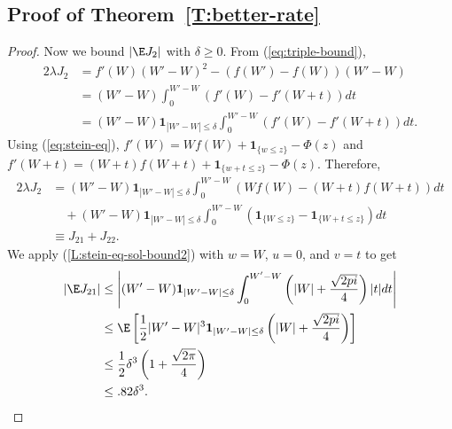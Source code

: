 \subsection{Proof of Theorem~\ref{T:better-rate}}
\begin{proof}
  Now we bound $|\E J_2|$ with $\delta \geq 0$.  From (\ref{eq:triple-bound}),
  \begin{align*}
    2 \lambda J_2 &= f'(W)(W'-W)^2-(f(W')-f(W))(W'-W) \\
    &= (W'-W) \int_0^{W'-W}(f'(W) - f'(W+t)) dt \\
    &= (W'-W) \mathbf{1}_{|W'-W| \leq \delta} \int_0^{W'-W}(f'(W)-f'(W+t)) dt.
  \end{align*}
  Using (\ref{eq:stein-eq}), $f'(W) = Wf(W) + \mathbf{1}_{\{w \leq z\}} - \Phi(z)$ and
  $f'(W + t) = (W + t)f(W + t) + \mathbf{1}_{\{w + t \leq z\}} - \Phi(z)$. Therefore,
  \begin{align*}
    2 \lambda J_2 &= (W'-W) \mathbf{1}_{|W'-W| \leq \delta} \int_0^{W'-W}(Wf(W)-(W+t)f(W+t)) dt \\
    &\quad + (W'-W) \mathbf{1}_{|W'-W| \leq \delta} \int_0^{W'-W}(\mathbf{1}_{\{W \leq z\}} - \mathbf{1}_{\{W + t \leq z\}}) dt \\
    &\equiv J_{21} + J_{22}.
  \end{align*}
  We apply (\ref{L:stein-eq-sol-bound2}) with $w = W$, $u = 0$, and $v = t$ to get
  \begin{align*}
    |\E J_{21}| &\leq \left |
    (W'-W) \mathbf{1}_{|W'-W| \leq \delta} \int_0^{W'-W} \left( |W| + \frac{\sqrt{2 pi}}{4} \right ) |t| dt
    \right | \\
    &\leq \E \left [
      \frac{1}{2} |W' - W|^3 \mathbf{1}_{|W'-W| \leq \delta} \left( |W| + \frac{\sqrt{2 pi}}{4} \right )
    \right ] \\
    &\leq \frac{1}{2} \delta^3 \left ( 1 + \frac{\sqrt{2 \pi}}{4} \right ) \\
    &\leq .82 \delta^3.
  \end{align*}


\end{proof}
